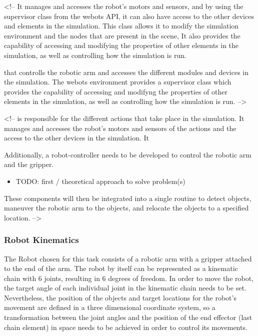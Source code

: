 <!-- 
It manages and accesses the robot's motors and sensors, and by using the supervisor class from the webots API, it can also have access to the other devices and elements in the simulation. This class allows it to modify the simulation environment and the nodes that are present in the scene, It also provides the capability of accessing and modifying the properties of other elements in the simulation, as well as controlling how the simulation is run.

 that controlls the robotic arm and accesses the different modules and devices in the simulation. The webots environment provides a supervisor class which provides the capability of accessing and modifyng the properties of other elements in the simulation, as well as controlling how the simulation is run. -->



<!-- is responsible for the different actions that take place in the simulation. It manages and accesses the robot's motors and sensors of the actions and the access to the other devices in the simulation. It 

Additionally, a robot-controller needs to be developed to control the robotic arm and the gripper.

\begin{itemize}
    \item TODO: first / theoretical approach to solve problem(s)
\end{itemize}  
These components will then be integrated into a single routine to detect objects, maneuver the robotic arm to the objects, and relocate the objects to a specified location. -->

\subsubsection{Robot Kinematics}


The Robot chosen for this task consists of a robotic arm with a gripper attached to the end of the arm. The robot by itself can be represented as a kinematic chain with 6 joints, resulting in 6 degrees of freedom.
In order to move the robot, the target angle of each individual joint in the kinematic chain needs to be set. Nevertheless, the position of the objects and target locations for the robot's movement are defined in a three dimensional coordinate system, so a transformation between the joint angles and the position of the end effector (last chain element) in space needs to be achieved in order to control its movements.

